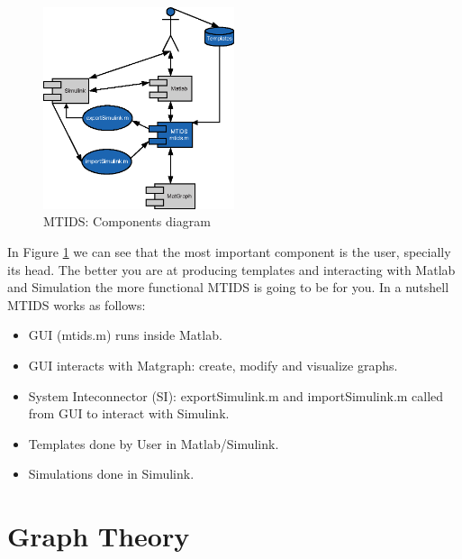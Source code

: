\documentclass[a4paper,twoside, openright,12pt]{report}
\begin{document}
 

\begin{figure}[htb]
\centering
\includegraphics[width=0.5\textwidth]{pics/uml.eps}
\caption[MTIDS components]{MTIDS: Components diagram}
\label{componentsFig}
\end{figure}

In Figure \ref{componentsFig} we can see that the most important component is the user, specially its head. The better you are at producing templates
and interacting with Matlab and Simulation the more functional MTIDS is going to be for you.
In a nutshell MTIDS works as follows:
\begin{itemize}
\item GUI (mtids.m) runs inside Matlab.
\item GUI interacts with Matgraph: create, modify and visualize graphs.  
\item System Inteconnector (SI): exportSimulink.m and importSimulink.m called from GUI to interact with Simulink.
\item Templates done by User in Matlab/Simulink.
\item Simulations done in Simulink.
\end{itemize}
%  
% 

\chapter{Graph Theory}\label{chapter2}
 
\end{document}
